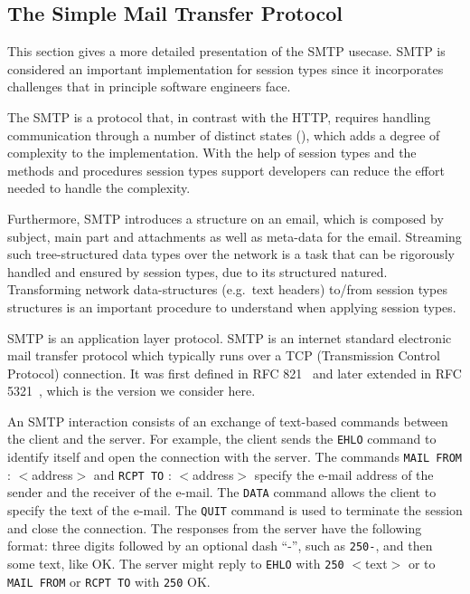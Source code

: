 \subsection{The Simple Mail Transfer Protocol}

This section gives a more detailed presentation of the SMTP
usecase. SMTP is considered an important implementation for
session types since it incorporates challenges that in principle
software engineers face.

The SMTP is a protocol that, in contrast with the HTTP, requires handling
communication through a number of distinct states (),
which adds a degree of complexity to the implementation.
With the help of session types and the methods and procedures
session types support developers can reduce the effort
needed to handle the complexity.

Furthermore, SMTP introduces a structure on an email,
which is composed by subject, main part and attachments
as well as meta-data for the email. Streaming such 
tree-structured data types over the network is a task that
can be rigorously handled and ensured by session types,
due to its structured natured. Transforming
network data-structures (e.g.~text headers)
to/from session types structures is an important
procedure to understand when applying session types. 


SMTP is an application layer protocol.
{SMTP} is an internet standard
electronic mail transfer protocol which typically runs over a TCP
(Transmission Control Protocol) connection.
It was first defined in RFC
821~\cite{SMTP-rfc} and later extended in RFC 5321~\cite{ESMTP-rfc},
which is the version we consider here.


An SMTP interaction consists of an exchange of text-based {commands}
between the client and the server.
For example, the client sends the
\lstinline|EHLO| command to identify itself and open the connection with
the server.
%
The commands \lstinline|MAIL FROM| : $<$address$>$ and \lstinline|RCPT TO| : $<$address$>$
specify the e-mail address of the sender and the
receiver of the e-mail.
%
The \lstinline|DATA| command allows the client to specify the text of
the e-mail. The \lstinline|QUIT| command is used to terminate the
session and close the connection. The responses from the server have the
following format: three digits followed by an optional dash ``-'', such
as \lstinline|250-|, and then some text, like OK. The server might reply
to \lstinline|EHLO| with \lstinline|250| $<$text$>$ or to
\lstinline|MAIL FROM| or \lstinline|RCPT TO| with \lstinline|250| OK.


